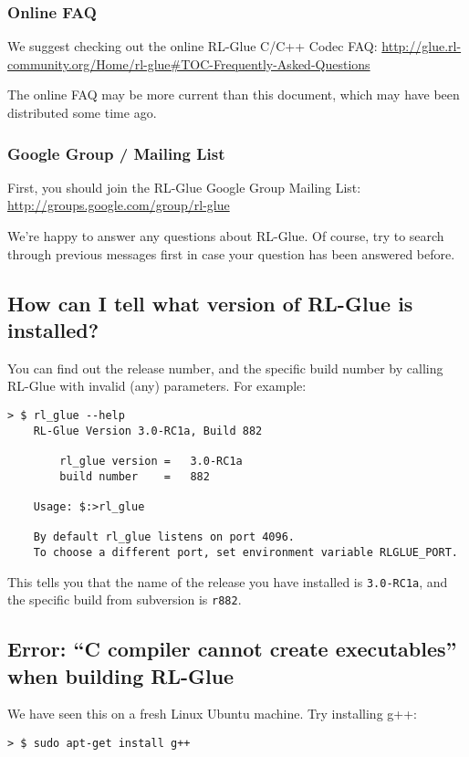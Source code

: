 \documentclass[11pt]{article}
\begin{document}
\subsubsection{Online FAQ}
We suggest checking out the online RL-Glue C/C++ Codec FAQ:\newline
\url{http://glue.rl-community.org/Home/rl-glue#TOC-Frequently-Asked-Questions}

The online FAQ may be more current than this document, which may have been distributed some time ago.

\subsubsection{Google Group / Mailing List}
First, you should join the RL-Glue Google Group Mailing List:\newline
\url{http://groups.google.com/group/rl-glue}

We're happy to answer any questions about RL-Glue.  Of course, try to search through previous messages first in case your question has been answered before.

\subsection{How can I tell what version of RL-Glue is installed?}
You can find out the release number, and the specific build number by 
calling RL-Glue with invalid (any) parameters.  For example:
\begin{verbatim}
> $ rl_glue --help
    RL-Glue Version 3.0-RC1a, Build 882

        rl_glue version	=	3.0-RC1a
        build number	=	882

    Usage: $:>rl_glue

    By default rl_glue listens on port 4096.
    To choose a different port, set environment variable RLGLUE_PORT.
\end{verbatim}

This tells you that the name of the release you have installed is \texttt{3.0-RC1a}, and the 
specific build from subversion is \texttt{r882}.


\subsection{Error: ``C compiler cannot create executables'' when building RL-Glue}

We have seen this on a fresh Linux Ubuntu machine.  Try installing g++:
\begin{verbatim}
> $ sudo apt-get install g++
\end{verbatim}
\end{document}
